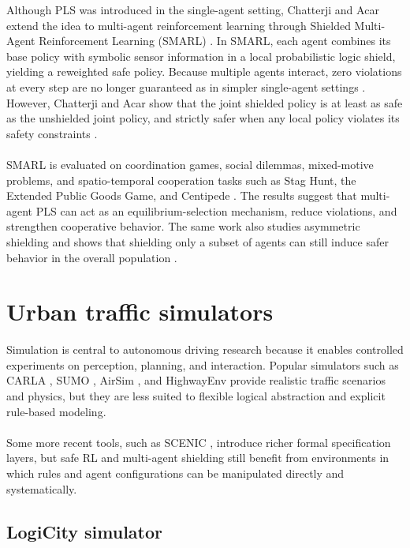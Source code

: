 Although PLS was introduced in the single-agent setting, Chatterji and Acar extend the idea to multi-agent reinforcement learning through Shielded Multi-Agent Reinforcement Learning (SMARL) \cite{chatterji2025thinksmartactsmarl}. In SMARL, each agent combines its base policy with symbolic sensor information in a local probabilistic logic shield, yielding a reweighted safe policy. Because multiple agents interact, zero violations at every step are no longer guaranteed as in simpler single-agent settings \cite{minihackexp}. However, Chatterji and Acar show that the joint shielded policy is at least as safe as the unshielded joint policy, and strictly safer when any local policy violates its safety constraints \cite{chatterji2025thinksmartactsmarl}.
\\
\\
SMARL is evaluated on coordination games, social dilemmas, mixed-motive problems, and spatio-temporal cooperation tasks such as Stag Hunt, the Extended Public Goods Game, and Centipede \cite{chatterji2025thinksmartactsmarl}. The results suggest that multi-agent PLS can act as an equilibrium-selection mechanism, reduce violations, and strengthen cooperative behavior. The same work also studies asymmetric shielding and shows that shielding only a subset of agents can still induce safer behavior in the overall population \cite{chatterji2025thinksmartactsmarl}.

\section{Urban traffic simulators}

Simulation is central to autonomous driving research because it enables controlled experiments on perception, planning, and interaction. Popular simulators such as CARLA \cite{dosovitskiy2017carlaopenurbandriving}, SUMO \cite{8569938}, AirSim \cite{shah2017airsimhighfidelityvisualphysical}, and HighwayEnv \cite{highway-env} provide realistic traffic scenarios and physics, but they are less suited to flexible logical abstraction and explicit rule-based modeling.
\\
\\
Some more recent tools, such as SCENIC \cite{elmaaroufi2024scenicnlgeneratingprobabilisticscenario}, introduce richer formal specification layers, but safe RL and multi-agent shielding still benefit from environments in which rules and agent configurations can be manipulated directly and systematically.

\subsection{LogiCity simulator}

